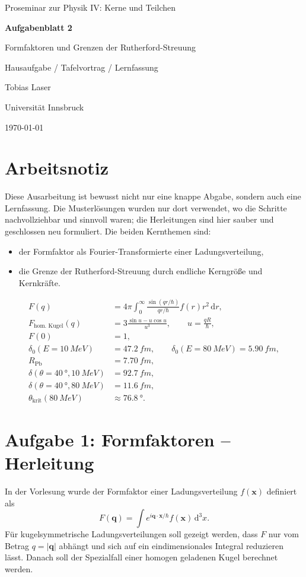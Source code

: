 \documentclass[11pt,a4paper]{scrartcl}
\newcommand{\CourseTitle}{Proseminar zur Physik IV: Kerne und Teilchen}
\newcommand{\DocumentKind}{Hausaufgabe / Tafelvortrag / Lernfassung}
\newcommand{\DocumentTitle}{Aufgabenblatt 2}
\newcommand{\DocumentSubtitle}{Formfaktoren und Grenzen der Rutherford-Streuung}
\newcommand{\AuthorName}{Tobias Laser}
\newcommand{\InstitutionName}{Universit\"at Innsbruck}
\newcommand{\SubmissionDate}{\today}
\newcommand{\makeuniversitytitle}{%
    \begin{titlepage}
        \centering
        \vspace*{2cm}
        {\Large \CourseTitle\par}
        \vspace{1.2cm}
        {\huge\bfseries \DocumentTitle\par}
        \vspace{0.4cm}
        {\Large \DocumentSubtitle\par}
        \vspace{1cm}
        {\Large \DocumentKind\par}
        \vfill
        {\large \AuthorName\par}
        \vspace{0.2cm}
        {\large \InstitutionName\par}
        \vspace{0.8cm}
        {\large \SubmissionDate\par}
    \end{titlepage}
    \pagenumbering{arabic}
}
\newcommand{\abs}[1]{\left| #1 \right|}
\newcommand{\dd}{\,\mathrm{d}}
\newcommand{\vect}[1]{\bm{#1}}
\begin{document}
\makeuniversitytitle
\tableofcontents
\newpage

\section*{Arbeitsnotiz}

Diese Ausarbeitung ist bewusst nicht nur eine knappe Abgabe, sondern auch eine Lernfassung. Die Musterl\"osungen wurden nur dort verwendet, wo die Schritte nachvollziehbar und sinnvoll waren; die Herleitungen sind hier sauber und geschlossen neu formuliert. Die beiden Kernthemen sind:
\begin{itemize}
    \item der Formfaktor als Fourier-Transformierte einer Ladungsverteilung,
    \item die Grenze der Rutherford-Streuung durch endliche Kerngr\"o\ss{}e und Kernkr\"afte.
\end{itemize}

\begin{summarybox}[title=Endergebnisse auf einen Blick]
\begin{align*}
    F(q) &= 4\pi\int_0^\infty \frac{\sin(qr/\hbar)}{qr/\hbar} f(r)r^2\dd r,\\
    F_{\text{hom. Kugel}}(q) &= 3\frac{\sin u-u\cos u}{u^3}, \qquad u=\frac{qR}{\hbar},\\
    F(0)&=1,\\[0.4em]
    \delta_0(E=\SI{10}{MeV})&=\SI{47.2}{fm},\qquad
    \delta_0(E=\SI{80}{MeV})=\SI{5.90}{fm},\\
    R_{\mathrm{Pb}}&=\SI{7.70}{fm},\\
    \delta(\theta=\SI{40}{\degree},\SI{10}{MeV})&=\SI{92.7}{fm},\\
    \delta(\theta=\SI{40}{\degree},\SI{80}{MeV})&=\SI{11.6}{fm},\\
    \theta_{\mathrm{krit}}(\SI{80}{MeV})&\approx \SI{76.8}{\degree}.
\end{align*}
\end{summarybox}

\newpage

\section{Aufgabe 1: Formfaktoren -- Herleitung}

\begin{taskbox}
In der Vorlesung wurde der Formfaktor einer Ladungsverteilung $f(\vect{x})$ definiert als
\[
    F(\vect{q})=\int e^{i\vect{q}\cdot\vect{x}/\hbar}f(\vect{x})\dd^3x.
\]
F\"ur kugelsymmetrische Ladungsverteilungen soll gezeigt werden, dass $F$ nur vom Betrag $q=\abs{\vect{q}}$ abh\"angt und sich auf ein eindimensionales Integral reduzieren l\"asst. Danach soll der Spezialfall einer homogen geladenen Kugel berechnet werden.
\end{taskbox}
\end{document}
